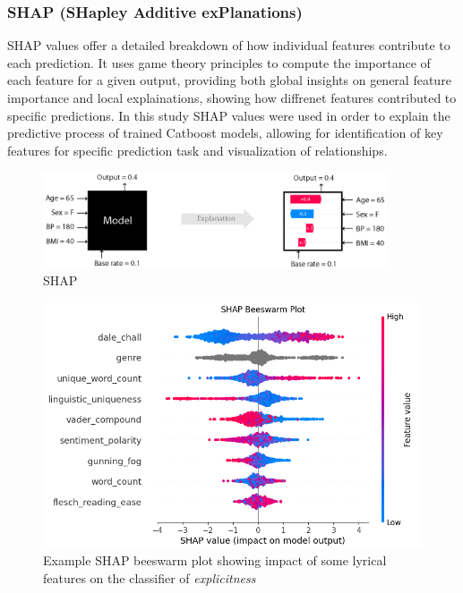 \subsubsection*{SHAP (SHapley Additive exPlanations)}
SHAP values offer a detailed  breakdown of how individual features contribute
to  each prediction. It uses game theory principles to compute the importance
of each feature for a given output, providing both global insights on general
feature importance and  local explainations, showing how diffrenet features
contributed to specific predictions. In this study SHAP values were used in
order to explain the predictive process of trained Catboost models, allowing
for identification of key features for specific prediction task and
visualization of relationships.

\begin{center}
\begin{figure}[ht]
  \centering
  \includegraphics[width=4in]{img/shap_intro.png}
  \caption{SHAP}
  \label{Figure:fig_beh}
\end{figure}
\end{center}

\begin{center}
\begin{figure}[ht]
  \centering
  \includegraphics[width=4.5in]{img/shap_beeswarm.png}
  \caption{Example SHAP beeswarm plot showing impact of some lyrical features
  on the classifier of \textit{explicitness}}
  \label{Figure:fig_beh}
\end{figure}
\end{center}

